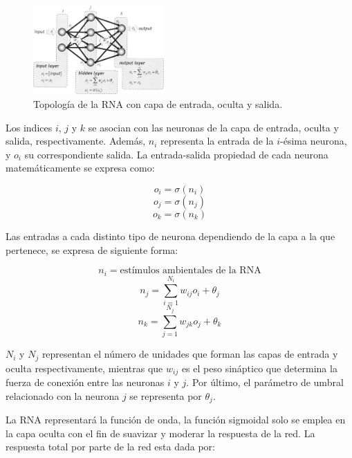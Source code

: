 \begin{figure}[H]
	\centering
	\includegraphics[width=5cm]{img/percep.jpg}
	\caption{Topolog\'ia de la RNA con capa de entrada, oculta y salida.}
	\label{fig:percep}
\end{figure}

Los indices $i$, $j$ y $k$ se asocian con las neuronas de la capa de entrada, oculta y salida, respectivamente. Adem\'as, $n_i$ representa la entrada de la $i$-\'esima neurona, y $o_i$ su correspondiente salida. La entrada-salida propiedad de cada neurona matem\'aticamente se expresa como: 

\begin{equation} o_i=\sigma(n_i) \label{entrada}\end{equation}
\begin{equation} o_j=\sigma(n_j) \label{oculta}\end{equation}
\begin{equation} o_k=\sigma(n_k) \label{salida}\end{equation}

Las entradas a cada distinto tipo de neurona dependiendo de la capa a la que pertenece, se expresa de siguiente forma:

\begin{equation} n_i=\text{est\'imulos ambientales de la RNA} \label{estimulo}\end{equation}
\begin{equation} n_j=\sum^{N_i}_{i=1}w_{ij}o_i+\theta_j \end{equation}
\begin{equation} n_k=\sum^{N_j}_{j=1}w_{jk}o_j+\theta_k \end{equation}

$N_i$ y $N_j$ representan el n\'umero de unidades que forman las capas de entrada y oculta respectivamente, mientras que $w_{ij}$ es el peso sin\'aptico que determina la fuerza de conexi\'on entre las neuronas $i$ y $j$. Por \'ultimo, el par\'ametro de umbral relacionado con la neurona $j$ se representa por $\theta_j$.

La RNA representar\'a la funci\'on de onda, la funci\'on sigmoidal solo se emplea en la capa oculta con el fin de suavizar y moderar la respuesta de la red. La respuesta total por parte de la red esta dada por:

